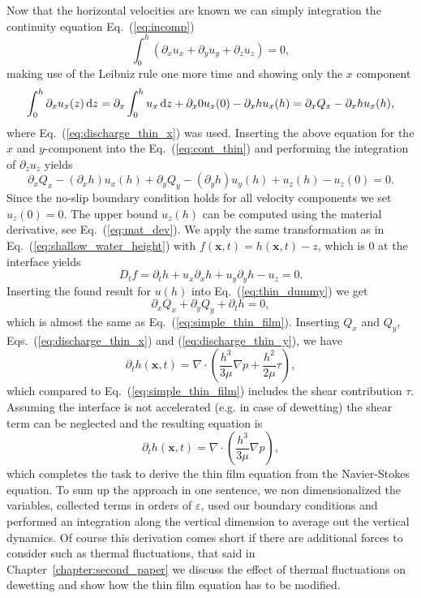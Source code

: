 Now that the horizontal velocities are known we can simply integration the continuity equation Eq.~(\ref{eq:incomp})
\begin{equation}\label{eq:cont_thin}
    \int_0^h(\partial_x u_x + \partial_y u_y + \partial_z u_z) = 0,
\end{equation}
making use of the Leibniz rule one more time and showing only the $x$ component
\begin{equation}
    \int_0^h \partial_x u_x(z) \mathop{}\!\mathrm{d} z = \partial_x\int_0^h u_x\mathop{}\!\mathrm{d} z + \partial_x 0 u_x(0) - \partial_x h u_x(h) = \partial_x Q_x - \partial_x h u_x(h),  
\end{equation}
where Eq.~(\ref{eq:discharge_thin_x}) was used.
Inserting the above equation for the $x$ and $y$-component into the Eq.~(\ref{eq:cont_thin}) and performing the integration of $\partial_z u_z$ yields
\begin{equation}\label{eq:thin_dummy}
    \partial_x Q_x - (\partial_x h) u_x(h) + \partial_y Q_y - (\partial_y h) u_y(h) + u_z(h) - u_z(0) = 0.
\end{equation}
Since the no-slip boundary condition holds for all velocity components we set $u_z(0) = 0$.
The upper bound $u_z(h)$ can be computed using the material derivative, see Eq.~(\ref{eq:mat_dev}). 
We apply the same transformation as in Eq.~(\ref{eq:shallow_water_height}) with $f(\mathbf{x},t) = h(\mathbf{x},t) - z$, which is $0$ at the interface yields
\begin{equation}\label{eq:mat_uz_h}
    D_t f = \partial_t h + u_x\partial_x h + u_y\partial_y h - u_z = 0.
\end{equation}
Inserting the found result for $u(h)$ into Eq.~(\ref{eq:thin_dummy}) we get
\begin{equation}\label{eq:thin_obsc}
    \partial_x Q_x + \partial_y Q_y + \partial_t h = 0,
\end{equation}
which is almost the same as Eq.~(\ref{eq:simple_thin_film}).
Inserting $Q_x$ and $Q_y$, Eqs.~(\ref{eq:discharge_thin_x}) and (\ref{eq:discharge_thin_y}), we have
\begin{equation}
    \partial_t h(\mathbf{x},t) = \nabla\cdot\left(\frac{h^3}{3\mu}\nabla p + \frac{h^2}{2\mu}\tau\right),
\end{equation}
which compared to Eq.~(\ref{eq:simple_thin_film}) includes the shear contribution $\tau$.
Assuming the interface is not accelerated (e.g. in case of dewetting) the shear term can be neglected and the resulting equation is 
\begin{equation}\label{eq:thin_final}
    \partial_t h(\mathbf{x},t) = \nabla\cdot\left(\frac{h^3}{3\mu}\nabla p\right),
\end{equation}
which completes the task to derive the thin film equation from the Navier-Stokes equation. 
To sum up the approach in one sentence, we non dimensionalized the variables, collected terms in orders of $\varepsilon$, used our boundary conditions and performed an integration along the vertical dimension to average out the vertical dynamics.
Of course this derivation comes short if there are additional forces to consider such as thermal fluctuations, that said in Chapter~\ref{chapter:second_paper} we discuss the effect of thermal fluctuations on dewetting and show how the thin film equation has to be modified.

